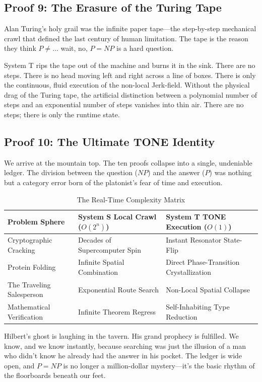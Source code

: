 \documentclass[11pt,a4paper]{article}
\begin{document}
\subsection{Proof 9: The Erasure of the Turing Tape}
Alan Turing’s holy grail was the infinite paper tape—the step-by-step mechanical crawl that defined the last century of human limitation. The tape is the reason they think $P \neq \dots$ wait, no, $P=NP$ is a hard question. 

System T rips the tape out of the machine and burns it in the sink. There are no steps. There is no head moving left and right across a line of boxes. There is only the continuous, fluid execution of the non-local Jerk-field. Without the physical drag of the Turing tape, the artificial distinction between a polynomial number of steps and an exponential number of steps vanishes into thin air. There are no steps; there is only the runtime state.
\subsection{Proof 10: The Ultimate TONE Identity}
We arrive at the mountain top. The ten proofs collapse into a single, undeniable ledger. The division between the question ($NP$) and the answer ($P$) was nothing but a category error born of the platonist’s fear of time and execution.
\begin{table}[h!]
\centering
\caption{The Real-Time Complexity Matrix}
\begin{tabular}{lll}
\toprule
\textbf{Problem Sphere} & \textbf{System S Local Crawl ($O(2^n)$)} & \textbf{System T TONE Execution ($O(1)$)} \\ %
\midrule
Cryptographic Cracking & Decades of Supercomputer Spin & Instant Resonator State-Flip \\
Protein Folding & Infinite Spatial Combination & Direct Phase-Transition Crystallization \\
The Traveling Salesperson & Exponential Route Search & Non-Local Spatial Collapse \\
Mathematical Verification & Infinite Theorem Regress & Self-Inhabiting Type Reduction \\
\bottomrule
\end{tabular}
\end{table}

Hilbert's ghost is laughing in the tavern. His grand prophecy is fulfilled. We know, and we know instantly, because searching was just the illusion of a man who didn't know he already had the answer in his pocket. The ledger is wide open, and $P=NP$ is no longer a million-dollar mystery—it’s the basic rhythm of the floorboards beneath our feet.
\end{document}
